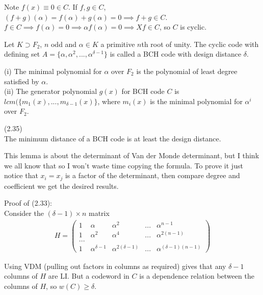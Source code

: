 \documentclass[a4paper]{article}
\begin{document}
Note $f(x) \equiv 0 \in C$. If $f,g \in C$, $(f+g) (\alpha) = f(\alpha)+g(\alpha) = 0 \implies f+g \in C$.\\
$f \in C \implies f(\alpha) = 0 \implies \alpha f(\alpha) =0 \implies Xf \in C$, so $C$ is cyclic.

\begin{defi}
Let $K \supset F_2$, $n$ odd and $\alpha \in K$ a primitive $n$th root of unity. The cyclic code with defining set $A = \{\alpha,\alpha^2,...,\alpha^{\delta-1}\}$ is called a BCH code with design distance $\delta$.
\end{defi}

\begin{rem}
(i) The minimal polynomial for $\alpha$ over $F_2$ is the polynomial of least degree satisfied by $\alpha$.\\
(ii) The generator polynomial $g(x)$ for BCH code $C$ is $lcm(\{m_1(x),...,m_{\delta-1}(x)\}$, where $m_i(x)$ is the minimal polynomial for $\alpha^i$ over $F_2$.
\end{rem}

\begin{thm} (2.35)\\
The minimum distance of a BCH code is at least the design distance.
\end{thm}

\begin{lemma}
This lemma is about the determinant of Van der Monde determinant, but I think we all know that so I won't waste time copying the formula. To prove it just notice that $x_i = x_j$ is a factor of the determinant, then compare degree and coefficient we get the desired results.
\end{lemma}

Proof of (2.33):\\
Consider the $(\delta - 1) \times n$ matrix
\begin{equation*}
\begin{aligned}
H = \begin{pmatrix}
1 & \alpha & \alpha^2 & ... & \alpha^{n-1}\\
1 & \alpha^2 & \alpha^4 & ... & \alpha^{2(n-1)}\\
...\\
1 & \alpha^{\delta-1} & \alpha^{2(\delta-1)} & ... & \alpha^{(\delta-1)(n-1)}
\end{pmatrix}
\end{aligned}
\end{equation*}

Using VDM (pulling out factors in columns as required) gives that any $\delta-1$ columns of $H$ are LI. But a codeword in $C$ is a dependence relation between the columns of $H$, so $w(C) \geq \delta$.
\end{document}

